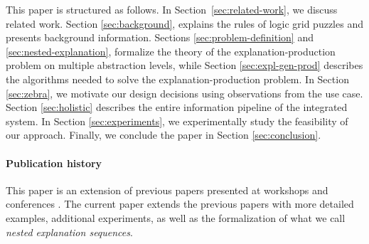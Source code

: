 This paper is structured as follows. In Section~\ref{sec:related-work}, we discuss related work. Section \ref{sec:background}, explains the rules of logic grid puzzles and presents background information. 
Sections \ref{sec:problem-definition} and \ref{sec:nested-explanation}, formalize the theory of the explanation-production problem on multiple abstraction levels, while Section \ref{sec:expl-gen-prod} describes the algorithms needed to solve the explanation-production problem.
In Section \ref{sec:zebra}, we motivate our design decisions using observations from the use case. 
Section \ref{sec:holistic} describes the entire information pipeline of the \ourtool integrated system. 
In Section \ref{sec:experiments}, we experimentally study the feasibility of our approach. 
Finally, we conclude the paper in Section \ref{sec:conclusion}.


\paragraph{Publication history} This paper is an extension of previous papers presented at workshops and conferences \cite{claesuser,DBLP:conf/bnaic/ClaesBCGG19,ecai/BogaertsGCG20}. The current paper extends the previous papers with more detailed examples, additional experiments, as well as the formalization of what we call \emph{nested explanation sequences}.

